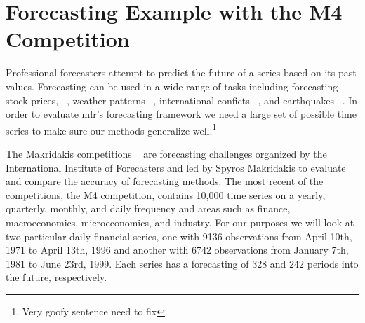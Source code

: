 \documentclass{article}\usepackage[]{graphicx}\usepackage[]{color}
\theoremstyle{definition}
\newcommand{\pkg}[1]{{\fontseries{b}\selectfont #1}}
\begin{document}
\section{Forecasting Example with the M4 Competition}
\label{sec:m4data}

Professional forecasters attempt to predict the future of a series based on its past values. Forecasting can be used in a wide range of tasks including forecasting stock prices, ~\cite{GRANGER19923}, weather patterns ~\cite{MurphymeteoForecast}, international conficts ~\cite{Chadefaux01012014}, and earthquakes ~\cite{earthquakeYegu}. In order to evaluate \pkg{mlr}'s forecasting framework we need a large set of possible time series to make sure our methods generalize well.\footnote{Very goofy sentence need to fix}

The Makridakis competitions ~\cite{Makridakis2000451} are forecasting challenges organized by the International Institute of Forecasters and led by Spyros Makridakis to evaluate and compare the accuracy of forecasting methods. The most recent of the competitions, the M4 competition, contains 10,000 time series on a yearly, quarterly, monthly, and daily frequency and areas such as finance, macroeconomics, microeconomics, and industry. For our purposes we will look at two particular daily financial series, one with 9136 observations from April 10th, 1971 to April 13th, 1996 and another with 6742 observations from January 7th, 1981 to June 23rd, 1999. Each series has a forecasting of 328 and 242 periods into the future, respectively.
\end{document}
